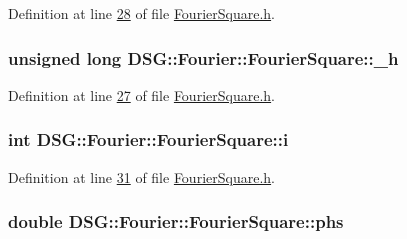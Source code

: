 Definition at line \hyperlink{_fourier_square_8h_source_l00028}{28} of file \hyperlink{_fourier_square_8h_source}{Fourier\+Square.\+h}.

\hypertarget{class_d_s_g_1_1_fourier_1_1_fourier_square_ac482ccc644bac01f3491503a755b453c}{
\subsubsection[{\+\_\+h}]{\setlength{\rightskip}{0pt plus 5cm}unsigned long D\+S\+G\+::\+Fourier\+::\+Fourier\+Square\+::\+\_\+h\hspace{0.3cm}{\ttfamily [protected]}}}\label{class_d_s_g_1_1_fourier_1_1_fourier_square_ac482ccc644bac01f3491503a755b453c}


Definition at line \hyperlink{_fourier_square_8h_source_l00027}{27} of file \hyperlink{_fourier_square_8h_source}{Fourier\+Square.\+h}.

\hypertarget{class_d_s_g_1_1_fourier_1_1_fourier_square_ad52c23216a09d1933e5b3289f2d54db2}{
\subsubsection[{i}]{\setlength{\rightskip}{0pt plus 5cm}int D\+S\+G\+::\+Fourier\+::\+Fourier\+Square\+::i\hspace{0.3cm}{\ttfamily [protected]}}}\label{class_d_s_g_1_1_fourier_1_1_fourier_square_ad52c23216a09d1933e5b3289f2d54db2}


Definition at line \hyperlink{_fourier_square_8h_source_l00031}{31} of file \hyperlink{_fourier_square_8h_source}{Fourier\+Square.\+h}.

\hypertarget{class_d_s_g_1_1_fourier_1_1_fourier_square_a6e20ab344501c18d79d594ec83f34164}{
\subsubsection[{phs}]{\setlength{\rightskip}{0pt plus 5cm}double D\+S\+G\+::\+Fourier\+::\+Fourier\+Square\+::phs\hspace{0.3cm}{\ttfamily [protected]}}}\label{class_d_s_g_1_1_fourier_1_1_fourier_square_a6e20ab344501c18d79d594ec83f34164}


